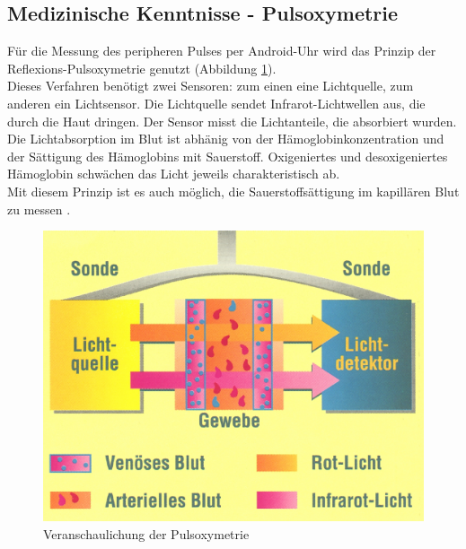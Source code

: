 \textbf{} 

\subsection{Medizinische Kenntnisse - Pulsoxymetrie} 
Für die Messung des peripheren Pulses per Android-Uhr wird das Prinzip der Reflexions-Pulsoxymetrie genutzt (Abbildung \ref{pic:pulsoxy}).\\[0.5cm]
Dieses Verfahren benötigt zwei Sensoren: zum einen eine Lichtquelle, zum anderen ein Lichtsensor. Die Lichtquelle sendet Infrarot-Lichtwellen aus, die durch die Haut dringen. Der Sensor misst die Lichtanteile, die absorbiert wurden. \\[0.5cm]
Die Lichtabsorption im Blut ist abhänig von der Hämoglobinkonzentration und der Sättigung des Hämoglobins mit Sauerstoff. Oxigeniertes und desoxigeniertes Hämoglobin schwächen das Licht jeweils charakteristisch ab. \\[0.5cm]
Mit diesem Prinzip ist es auch möglich, die Sauerstoffsättigung im kapillären Blut zu messen \cite{behandlungsassitenz}.\\[0.5cm]
\begin{figure}[H]
	\centering
	\includegraphics[scale=1.0]{images/pulsoxy.jpg}
	\caption{Veranschaulichung der Pulsoxymetrie\cite{messprinzip-pulsoxi}}
	\label{pic:pulsoxy}
\end{figure}


